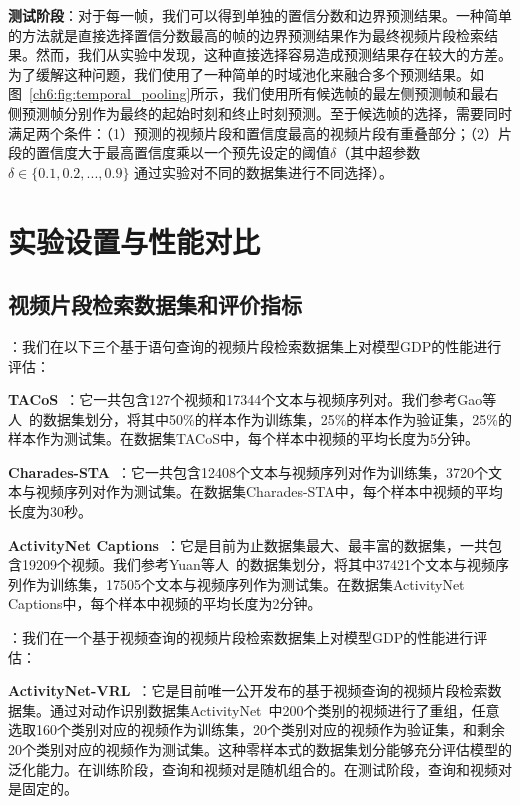 \textbf{测试阶段}：对于每一帧，我们可以得到单独的置信分数和边界预测结果。一种简单的方法就是直接选择置信分数最高的帧的边界预测结果作为最终视频片段检索结果。然而，我们从实验中发现，这种直接选择容易造成预测结果存在较大的方差。为了缓解这种问题，我们使用了一种简单的时域池化来融合多个预测结果。如图~\ref{ch6:fig:temporal_pooling}所示，我们使用所有候选帧的最左侧预测帧和最右侧预测帧分别作为最终的起始时刻和终止时刻预测。至于候选帧的选择，需要同时满足两个条件：（1）预测的视频片段和置信度最高的视频片段有重叠部分；（2）片段的置信度大于最高置信度乘以一个预先设定的阈值$\delta$（其中超参数$\delta \in \{0.1, 0.2, ..., 0.9 \}$ 通过实验对不同的数据集进行不同选择）。


\section{实验设置与性能对比}

\subsection{视频片段检索数据集和评价指标}

\textbf{}：我们在以下三个基于语句查询的视频片段检索数据集上对模型GDP的性能进行评估：

\textbf{TACoS}~\cite{regneri2013grounding}：它一共包含127个视频和17344个文本与视频序列对。我们参考Gao等人~\cite{gao2017tall}的数据集划分，将其中50\%的样本作为训练集，25\%的样本作为验证集，25\%的样本作为测试集。在数据集TACoS中，每个样本中视频的平均长度为5分钟。

\textbf{Charades-STA}~\cite{gao2017tall}：它一共包含12408个文本与视频序列对作为训练集，3720个文本与视频序列对作为测试集。在数据集Charades-STA中，每个样本中视频的平均长度为30秒。

\textbf{ActivityNet Captions}~\cite{krishna2017dense}：它是目前为止数据集最大、最丰富的数据集，一共包含19209个视频。我们参考Yuan等人~\cite{yuan2019find}的数据集划分，将其中37421个文本与视频序列作为训练集，17505个文本与视频序列作为测试集。在数据集ActivityNet Captions中，每个样本中视频的平均长度为2分钟。


\textbf{}：我们在一个基于视频查询的视频片段检索数据集上对模型GDP的性能进行评估：

\textbf{ActivityNet-VRL}~\cite{feng2018video}：它是目前唯一公开发布的基于视频查询的视频片段检索数据集。通过对动作识别数据集ActivityNet~\cite{caba2015activitynet}中200个类别的视频进行了重组，任意选取160个类别对应的视频作为训练集，20个类别对应的视频作为验证集，和剩余20个类别对应的视频作为测试集。这种零样本式的数据集划分能够充分评估模型的泛化能力。在训练阶段，查询和视频对是随机组合的。在测试阶段，查询和视频对是固定的。



